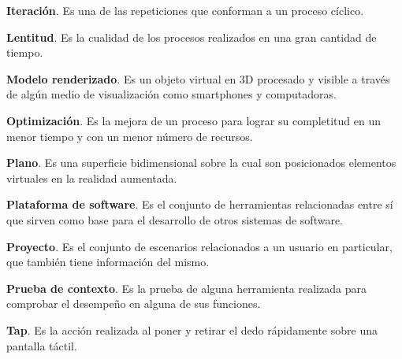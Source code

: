 \vspace{2mm}
\noindent
\textbf{Iteración}. Es una de las repeticiones que conforman a un proceso cíclico.\par
\vspace{2mm}
\noindent
\textbf{Lentitud}. Es la cualidad de los procesos realizados en una gran cantidad de tiempo.\par
\vspace{2mm}
\noindent
\textbf{Modelo renderizado}. Es un objeto virtual en 3D procesado y visible a través de algún medio de visualización como smartphones y computadoras.\par
\vspace{2mm}
\noindent
\textbf{Optimización}. Es la mejora de un proceso para lograr su completitud en un menor tiempo y con un menor número de recursos.\par
\vspace{2mm}
\noindent
\textbf{Plano}. Es una superficie bidimensional sobre la cual son posicionados elementos virtuales en la realidad aumentada.\par
\vspace{2mm}
\noindent
\textbf{Plataforma de software}. Es el conjunto de herramientas relacionadas entre sí que sirven como base para el desarrollo de otros sistemas de software.\par
\vspace{2mm}
\noindent
\textbf{Proyecto}. Es el conjunto de escenarios relacionados a un usuario en particular, que también tiene información del mismo.\par
\vspace{2mm}
\noindent
\textbf{Prueba de contexto}. Es la prueba de alguna herramienta realizada para comprobar el desempeño en alguna de sus funciones.\par
\vspace{2mm}
\noindent
\textbf{Tap}. Es la acción realizada al poner y retirar el dedo rápidamente sobre una pantalla táctil.\par